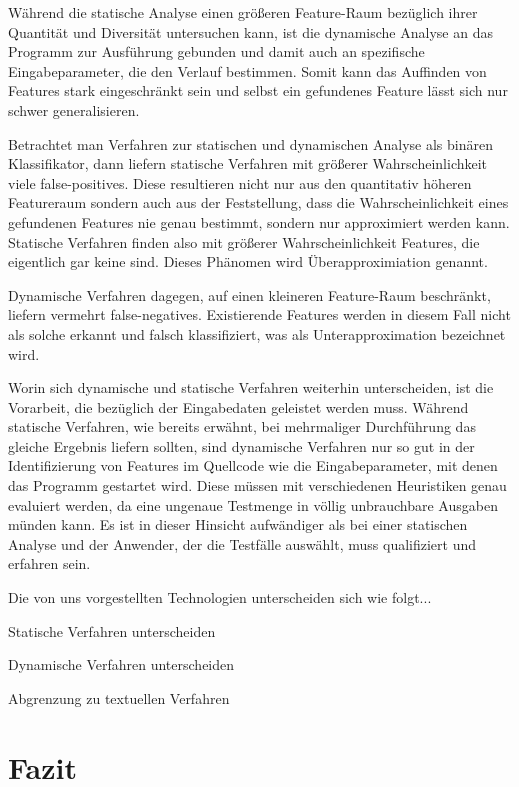 \documentclass[runningheads,a4paper]{llncs}
\begin{document}
Während die statische Analyse einen größeren Feature-Raum bezüglich ihrer Quantität und Diversität untersuchen kann, ist die dynamische Analyse an das Programm zur Ausführung gebunden und damit auch an spezifische Eingabeparameter, die den Verlauf bestimmen. Somit kann das Auffinden von Features stark eingeschränkt sein und selbst ein gefundenes Feature lässt sich nur schwer generalisieren.

Betrachtet man Verfahren zur statischen und dynamischen Analyse als binären Klassifikator, dann liefern statische Verfahren mit größerer Wahrscheinlichkeit viele false-positives. Diese resultieren nicht nur aus den quantitativ höheren Featureraum sondern auch aus der Feststellung, dass die Wahrscheinlichkeit eines gefundenen Features nie genau bestimmt, sondern nur approximiert werden kann. Statische Verfahren finden also mit größerer Wahrscheinlichkeit Features, die eigentlich gar keine sind. Dieses Phänomen wird Überapproximiation genannt.

Dynamische Verfahren dagegen, auf einen kleineren Feature-Raum beschränkt, liefern vermehrt false-negatives. Existierende Features werden in diesem Fall nicht als solche erkannt und falsch klassifiziert, was als Unterapproximation bezeichnet wird.

Worin sich dynamische und statische Verfahren weiterhin unterscheiden, ist die Vorarbeit, die bezüglich der Eingabedaten geleistet werden muss. Während statische Verfahren, wie bereits erwähnt, bei mehrmaliger Durchführung das gleiche Ergebnis liefern sollten, sind dynamische Verfahren nur so gut in der Identifizierung von Features im Quellcode wie die Eingabeparameter, mit denen das Programm gestartet wird. Diese müssen mit verschiedenen Heuristiken genau evaluiert werden, da eine ungenaue Testmenge in völlig unbrauchbare Ausgaben münden kann. Es ist in dieser Hinsicht aufwändiger als bei einer statischen Analyse und der Anwender, der die Testfälle auswählt, muss qualifiziert und erfahren sein.

Die von uns vorgestellten Technologien unterscheiden sich wie folgt...

Statische Verfahren unterscheiden

Dynamische Verfahren unterscheiden

Abgrenzung zu textuellen Verfahren

\clearpage

\section{Fazit}
\end{document}
